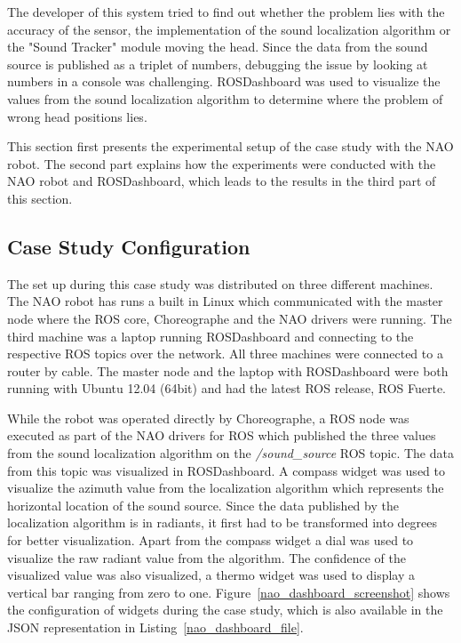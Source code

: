 The developer of this system tried to find out whether the problem lies with the accuracy of the sensor, the implementation of the sound localization algorithm or the "Sound Tracker" module moving the head. Since the data from the sound source is published as a triplet of numbers, debugging the issue by looking at numbers in a console was challenging. ROSDashboard was used to visualize the values from the sound localization algorithm to determine where the problem of wrong head positions lies.

This section first presents the experimental setup of the case study with the NAO robot. The second part explains how the experiments were conducted with the NAO robot and ROSDashboard, which leads to the results in the third part of this section.

\subsection{Case Study Configuration}
The set up during this case study was distributed on three different machines. The NAO robot has runs a built in Linux which communicated with the master node where the ROS core, Choreographe and the NAO drivers were running. The third machine was a laptop running ROSDashboard and connecting to the respective ROS topics over the network. All three machines were connected to a router by cable. The master node and the laptop with ROSDashboard were both running with Ubuntu 12.04 (64bit) and had the latest ROS release, ROS Fuerte.

While the robot was operated directly by Choreographe, a ROS node was executed as part of the NAO drivers for ROS which published the three values from the sound localization algorithm on the \emph{/sound\_source} ROS topic. The data from this topic was visualized in ROSDashboard. A compass widget was used to visualize the azimuth value from the localization algorithm which represents the horizontal location of the sound source. Since the data published by the localization algorithm is in radiants, it first had to be transformed into degrees for better visualization. Apart from the compass widget a dial was used to visualize the raw radiant value from the algorithm. The confidence of the visualized value was also visualized, a thermo widget was used to display a vertical bar ranging from zero to one. Figure~\ref{nao_dashboard_screenshot} shows the configuration of widgets during the case study, which is also available in the JSON representation in Listing~\ref{nao_dashboard_file}.

